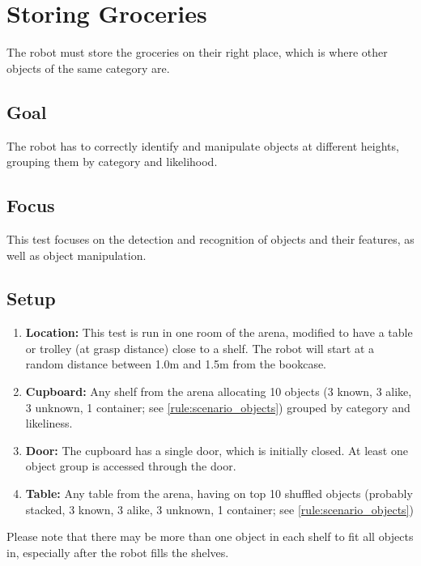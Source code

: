 \section{Storing Groceries}

The robot must store the groceries on their right place, which is where other objects of the same category are.

\subsection{Goal}
The robot has to correctly identify and manipulate objects at different heights, grouping them by category and likelihood.

\subsection{Focus}
This test focuses on the detection and recognition of objects and their features, as well as object manipulation.

\subsection{Setup}
\begin{enumerate}
\item \textbf{Location:} This test is run in one room of the arena, modified to have a table or trolley (at grasp distance) close to a shelf. The robot will start at a random distance between 1.0m and 1.5m from the bookcase.
\item \textbf{Cupboard:} Any shelf from the arena allocating 10 objects (3 known, 3 alike, 3 unknown, 1 container; see \ref{rule:scenario_objects}) grouped by category and likeliness. 
\item \textbf{Door:} The cupboard has a single door, which is initially closed. At least one object group is accessed through the door.
\item \textbf{Table:} Any table from the arena, having on top 10 shuffled objects (probably stacked, 3 known, 3 alike, 3 unknown, 1 container; see \ref{rule:scenario_objects})
\end{enumerate}

Please note that there may be more than one object in each shelf to fit all objects in, especially after the robot fills the shelves. 

